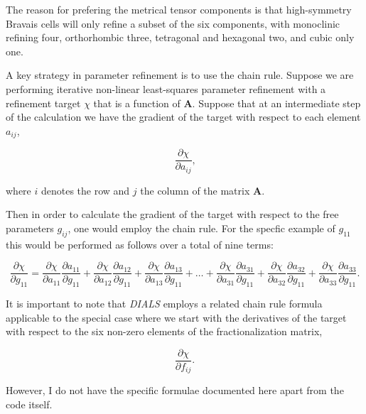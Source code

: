 \documentclass[12pt, letterpaper]{article}
\begin{document}
 The reason for prefering the metrical tensor components is that high-symmetry Bravais cells will only refine a subset of the six components, with monoclinic refining four, orthorhombic three, tetragonal and hexagonal two, and cubic only one.
 
 A key strategy in parameter refinement is to use the chain rule.  Suppose we are performing iterative non-linear least-squares parameter refinement with a refinement target $\chi$ that is a function of $\mathbf{A}$.  Suppose that at an intermediate step of the calculation we have the gradient of the target with respect to each element $a_{ij}$, 
 
   \begin{equation}
    \frac {\partial \chi} {\partial a_{ij}}
       \text{,}
    \label{eqn:frac}
  \end{equation}

 where $i$ denotes the row and $j$ the column of the matrix $\mathbf{A}$.

Then in order to calculate the gradient of the target with respect to the free parameters $g_{ij}$, one would employ the chain rule.  For the specfic example of $g_{11}$ this would be performed as follows over a total of nine terms:

   \begin{equation}
    \frac {\partial \chi} {\partial g_{11}} =
    \frac {\partial \chi} {\partial a_{11}} \frac {\partial a_{11}}{\partial g_{11}}+
    \frac {\partial \chi} {\partial a_{12}} \frac {\partial a_{12}}{\partial g_{11}}+
    \frac {\partial \chi} {\partial a_{13}} \frac {\partial a_{13}}{\partial g_{11}}+
    \ldots+
    \frac {\partial \chi} {\partial a_{31}} \frac {\partial a_{31}}{\partial g_{11}}+
    \frac {\partial \chi} {\partial a_{32}} \frac {\partial a_{32}}{\partial g_{11}}+
    \frac {\partial \chi} {\partial a_{33}} \frac {\partial a_{33}}{\partial g_{11}}
       \text{.}
    \label{eqn:fracC}
  \end{equation}

It is important to note that \textit{DIALS} employs a related chain rule formula applicable to the special case where we start with the derivatives of the target with respect to the six non-zero elements of the fractionalization matrix,

     \begin{equation}
    \frac {\partial \chi} {\partial f_{ij}}
       \text{.}
    \label{eqn:fracF}
  \end{equation}

  However, I do not have the specific formulae documented here apart from the code itself.  
  
\end{document}
